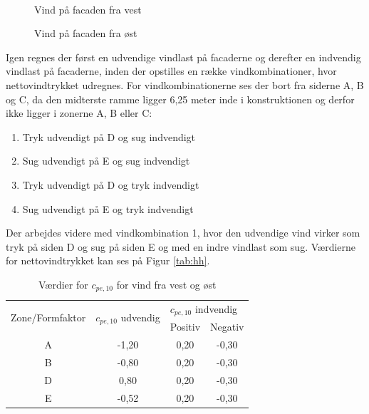 \begin{figure}[htbp]
\begin{minipage}[b]{0.48\textwidth}
	\end{minipage}\\ %
	\begin{minipage}[t]{0.48\textwidth}
		\caption{Vind på facaden fra vest \citep[ 7.2.2]{EU91}} %
		\label{fig:vindvest}
	\end{minipage}\hfill
	\begin{minipage}[t]{0.48\textwidth}
		\caption{Vind på facaden fra øst \citep[ 7.2.2]{EU91}} %
		\label{fig:vindost}
	\end{minipage}
\end{figure}

Igen regnes der først en udvendige vindlast på facaderne og derefter en indvendig vindlast på facaderne, inden der opstilles en række vindkombinationer, hvor nettovindtrykket udregnes. For vindkombinationerne ses der bort fra siderne A, B og C, da den midterste ramme ligger 6,25 meter inde i konstruktionen og derfor ikke ligger i zonerne A, B eller C:
\begin{enumerate}
	\item Tryk udvendigt på D og sug indvendigt
	\item Sug udvendigt på E og sug indvendigt
	\item Tryk udvendigt på D og tryk indvendigt  
	\item Sug udvendigt på E og tryk indvendigt
\end{enumerate}

Der arbejdes videre med vindkombination 1, hvor den udvendige vind virker som tryk på siden D og sug på siden E og med en indre vindlast som sug.
\newline \indent{     }  Værdierne for nettovindtrykket kan ses på Figur \ref{tab:hh}.

\begin{table}[htb]
	\begin{center}
		\begin{tabular}{ c c c c } 
			\hline
			\multirow{2}{*}{Zone/Formfaktor} & \multirow{2}{*}{$c_{pe,10}$ udvendig} & \multicolumn{2}{l}{$c_{pe,10}$ indvendig} \\ 
			& & Positiv & Negativ   		\\ \hline
			A & -1,20 & 0,20 & -0,30 \\	
			B & -0,80 & 0,20 & -0,30 \\	 
			D & 0,80 & 0,20 & -0,30 \\	
			E & -0,52 & 0,20 & -0,30 \\	
		\end{tabular}
		\caption{Værdier for $c_{pe,10}$ for vind fra vest og øst}
		\label{tab:ff}
	\end{center}
\end{table}

